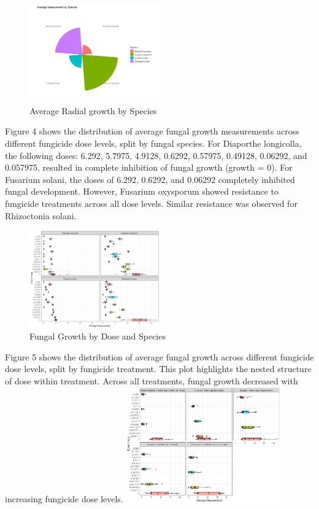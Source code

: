 \documentclass[
  10pt,
  letterpaper,
  twocolumn]{article}
\begin{document}
\begin{figure}

{\centering \includegraphics[width=0.5\textwidth,height=\textheight]{Fig4.jpeg}

}

\caption{Average Radial growth by Species}

\end{figure}

Figure 4 shows the distribution of average fungal growth measurements
across different fungicide dose levels, split by fungal species. For
Diaporthe longicolla, the following doses: 6.292, 5.7975, 4.9128,
0.6292, 0.57975, 0.49128, 0.06292, and 0.057975, resulted in complete
inhibition of fungal growth (growth = 0). For Fusarium solani, the doses
of 6.292, 0.6292, and 0.06292 completely inhibited fungal development.
However, Fusarium oxysporum showed resistance to fungicide treatments
across all dose levels. Similar resistance was observed for Rhizoctonia
solani.

\begin{figure}

{\centering \includegraphics[width=0.5\textwidth,height=\textheight]{Fig7.jpeg}

}

\caption{Fungal Growth by Dose and Species}

\end{figure}

Figure 5 shows the distribution of average fungal growth across
different fungicide dose levels, split by fungicide treatment. This plot
highlights the nested structure of dose within treatment. Across all
treatments, fungal growth decreased with increasing fungicide dose
levels.
\includegraphics[width=0.5\textwidth,height=\textheight]{Fig8.jpeg}
\end{document}
